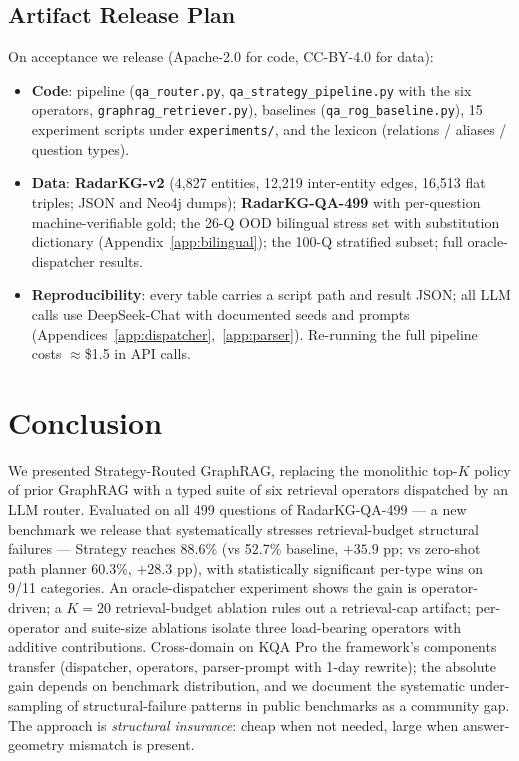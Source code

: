 \documentclass[review]{elsarticle}
\begin{document}
\subsection{Artifact Release Plan}
\label{sec:artifact}

On acceptance we release (Apache-2.0 for code, CC-BY-4.0 for data):
\begin{itemize}[topsep=0pt,itemsep=0pt,leftmargin=*]
  \item \textbf{Code}: pipeline (\texttt{qa\_router.py}, \texttt{qa\_strategy\_pipeline.py} with the six operators, \texttt{graphrag\_retriever.py}), baselines (\texttt{qa\_rog\_baseline.py}), 15 experiment scripts under \texttt{experiments/}, and the lexicon (relations / aliases / question types).
  \item \textbf{Data}: \textbf{RadarKG-v2} (4{,}827 entities, 12{,}219 inter-entity edges, 16{,}513 flat triples; JSON and Neo4j dumps); \textbf{RadarKG-QA-499} with per-question machine-verifiable gold; the 26-Q OOD bilingual stress set with substitution dictionary (Appendix~\ref{app:bilingual}); the 100-Q stratified subset; full oracle-dispatcher results.
  \item \textbf{Reproducibility}: every table carries a script path and result JSON; all LLM calls use DeepSeek-Chat with documented seeds and prompts (Appendices~\ref{app:dispatcher},~\ref{app:parser}). Re-running the full pipeline costs ${\approx}$\$1.5 in API calls.
\end{itemize}

\section{Conclusion}
\label{sec:conclusion}

We presented Strategy-Routed GraphRAG, replacing the monolithic top-$K$ policy of prior GraphRAG with a typed suite of six retrieval operators dispatched by an LLM router. Evaluated on all 499 questions of RadarKG-QA-499 --- a new benchmark we release that systematically stresses retrieval-budget structural failures --- Strategy reaches 88.6\% (vs 52.7\% baseline, $+35.9$ pp; vs zero-shot path planner 60.3\%, $+28.3$ pp), with statistically significant per-type wins on 9/11 categories. An oracle-dispatcher experiment shows the gain is operator-driven; a $K\!=\!20$ retrieval-budget ablation rules out a retrieval-cap artifact; per-operator and suite-size ablations isolate three load-bearing operators with additive contributions. Cross-domain on KQA Pro the framework's components transfer (dispatcher, operators, parser-prompt with 1-day rewrite); the absolute gain depends on benchmark distribution, and we document the systematic under-sampling of structural-failure patterns in public benchmarks as a community gap. The approach is \emph{structural insurance}: cheap when not needed, large when answer-geometry mismatch is present.
\end{document}
